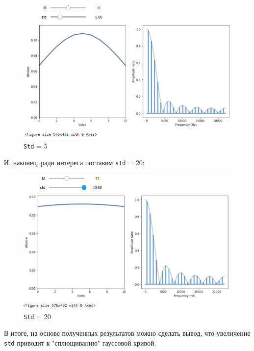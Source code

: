 \documentclass[a4paper]{article}
\begin{document}
            \begin{figure}[H]
                \centering
                \includegraphics[width=\textwidth]{ex_1_std_5.png}
                \caption{\texttt{Std} = 5}
                \label{fig:ex_1_std_5}
            \end{figure}
            
            И, наконец, ради интереса поставим \texttt{std} = 20:
            
            \begin{figure}[H]
                \centering
                \includegraphics[width=\textwidth]{ex_1_std_20.png}
                \caption{\texttt{Std} = 20}
                \label{fig:ex_1_std_20}
            \end{figure}
            
            В итоге, на основе полученных результатов можно сделать вывод, что увеличение \texttt{std} приводит к "сплющиванию"  гауссовой кривой. 
            
\end{document}
